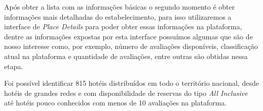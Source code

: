 

Após obter a lista com as informações básicas o segundo momento é obter informações mais detalhadas do estabelecimento, para isso utilizaremos a interface de \emph{Place Details} para poder obter essas informações na plataforma, dentre as informações expostas por esta interface possuímos algumas que são de nosso interesse como, por exemplo, número de avaliações disponíveis, classificação atual na plataforma e quantidade de avaliações, entre outras são obtidas nessa etapa.



Foi possível identificar 815 hotéis distribuídos em todo o território nacional, desde hotéis de grandes redes e com disponibilidade de reservas do tipo \emph{All Inclusive} até hotéis pouco conhecidos com menos de 10 avaliações na plataforma.







